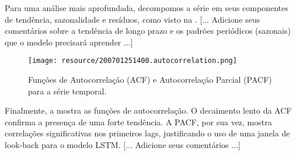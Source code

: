 Para uma análise mais aprofundada, decompomos a série em seus componentes de tendência, sazonalidade e
resíduos, como visto na .
[... Adicione seus comentários sobre a tendência de longo prazo e os padrões periódicos (sazonais) que o
modelo precisará aprender ...]

\begin{figure}[!htb]
    \centering
    \texttt{[image: resource/200701251400.autocorrelation.png]}
    \caption{Funções de Autocorrelação (ACF) e Autocorrelação Parcial (PACF) para a série temporal.}
    \label{fig:eda-acf-pacf}
\end{figure}

Finalmente, a  mostra as funções de autocorrelação. O decaimento lento da ACF confirma
a presença de uma forte tendência. A PACF, por sua vez, mostra correlações significativas nos primeiros lags,
justificando o uso de uma janela de look-back para o modelo LSTM.
[... Adicione seus comentários ...]
